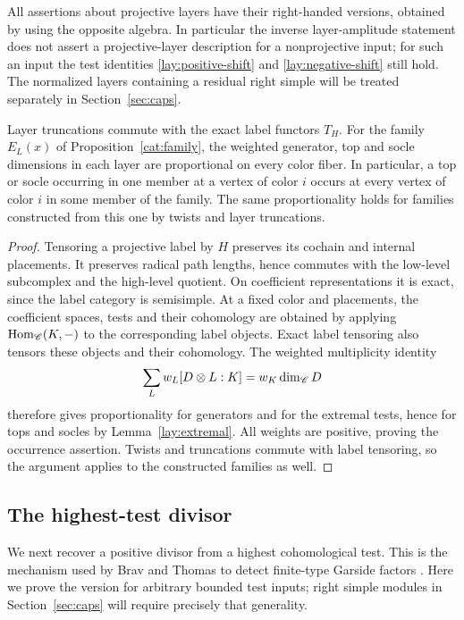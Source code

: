 All assertions about projective layers have their right-handed
versions, obtained by using the opposite algebra.  In particular the
inverse layer-amplitude statement does not assert a projective-layer
description for a nonprojective input; for such an input the test
identities \eqref{lay:positive-shift} and
\eqref{lay:negative-shift} still hold.  The normalized layers containing
a residual right simple will be treated separately in
Section~\ref{sec:caps}.

\begin{lemma}\label{lay:labels}
Layer truncations commute with the exact label functors $T_H$.
For the family $E_L(x)$ of Proposition~\ref{cat:family}, the weighted generator,
top and socle dimensions in each layer are proportional on every
color fiber.  In particular, a top or socle occurring in one member
at a vertex of color $i$ occurs at every vertex of color $i$ in some
member of the family.  The same proportionality holds for families
constructed from this one by twists and layer truncations.
\end{lemma}

\begin{proof}
Tensoring a projective label by $H$ preserves its cochain and internal
placements.  It preserves radical path lengths, hence commutes with
the low-level subcomplex and the high-level quotient.  On coefficient
representations it is exact, since the label category is semisimple.
At a fixed color and placements, the coefficient spaces, tests and
their cohomology are obtained by applying
$\operatorname{Hom}_{\mathscr C}(K,-)$ to the corresponding label objects.  Exact label
tensoring also tensors these objects and their cohomology.  The
weighted multiplicity identity
\[
 \sum_L w_L[D\otimes L:K]=w_K\dim_{\mathscr C}D
\]
therefore gives proportionality for generators and for the extremal
tests, hence for tops and socles by Lemma~\ref{lay:extremal}.
All weights are positive, proving the occurrence assertion.
Twists and truncations commute with label tensoring, so the argument
applies to the constructed families as well.
\end{proof}

\subsection{The highest-test divisor}

We next recover a positive divisor from a highest cohomological test.
This is the mechanism used by Brav and Thomas to detect finite-type
Garside factors \cite[Proposition~3.1 and Lemma~3.3]{BravThomas2011}.
Here we prove the version for arbitrary bounded test inputs; right simple
modules in Section~\ref{sec:caps} will require precisely that generality.

